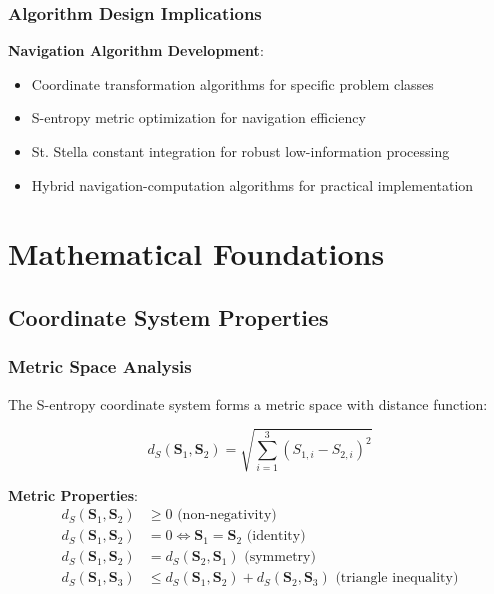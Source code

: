 \documentclass[11pt]{article}
\begin{document}
\subsubsection{Algorithm Design Implications}

\textbf{Navigation Algorithm Development}:
\begin{itemize}
\item Coordinate transformation algorithms for specific problem classes
\item S-entropy metric optimization for navigation efficiency
\item St. Stella constant integration for robust low-information processing
\item Hybrid navigation-computation algorithms for practical implementation
\end{itemize}

\section{Mathematical Foundations}

\subsection{Coordinate System Properties}

\subsubsection{Metric Space Analysis}

The S-entropy coordinate system forms a metric space with distance function:

\begin{equation}
d_S(\mathbf{S}_1, \mathbf{S}_2) = \sqrt{\sum_{i=1}^{3} (S_{1,i} - S_{2,i})^2}
\label{eq:s_entropy_metric}
\end{equation}

\textbf{Metric Properties}:
\begin{align}
d_S(\mathbf{S}_1, \mathbf{S}_2) &\geq 0 \text{ (non-negativity)} \\
d_S(\mathbf{S}_1, \mathbf{S}_2) &= 0 \iff \mathbf{S}_1 = \mathbf{S}_2 \text{ (identity)} \\
d_S(\mathbf{S}_1, \mathbf{S}_2) &= d_S(\mathbf{S}_2, \mathbf{S}_1) \text{ (symmetry)} \\
d_S(\mathbf{S}_1, \mathbf{S}_3) &\leq d_S(\mathbf{S}_1, \mathbf{S}_2) + d_S(\mathbf{S}_2, \mathbf{S}_3) \text{ (triangle inequality)}
\end{align}
\end{document}
